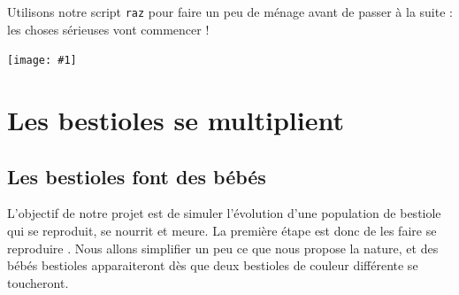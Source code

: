 \documentclass[a4paper,12pt]{book}
\newcommand{\capture}[1]
{
\begin{center}
	\texttt{[image: \#1]}
\end{center}
}
\newcommand{\code}[1]
{
\texttt{#1}
}
\begin{document}
Utilisons notre script \code{raz} pour faire un peu de ménage avant de passer à la suite : les choses sérieuses vont commencer !

\capture{bestioles2.png}

\chapter{Les bestioles se multiplient}

\section{Les bestioles font des bébés}

L'objectif de notre projet est de simuler l'évolution d'une population de bestiole qui se reproduit, se nourrit et meure. La première étape est donc de les faire se \og reproduire \fg. Nous allons simplifier un peu ce que nous propose la nature, et des bébés bestioles apparaiteront dès que deux bestioles de couleur différente se toucheront.
\end{document}
